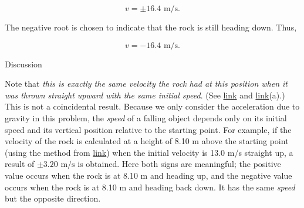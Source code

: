 \documentclass[
]{book}
\newenvironment{tinysection}{}{}
\begin{document}
\leavevmode\hypertarget{import-auto-id1763704}{}%
\[{{{v = {\pm \text{16}}}\text{.4\ m/s}}.}{}\]

The negative root is chosen to indicate that the rock is still heading
down. Thus,

\leavevmode\hypertarget{import-auto-id2563747}{}%
\[{{{v = {- \text{16}}}\text{.4\ m/s}}.}{}\]

\begin{tinysection}

{Discussion}

\end{tinysection}

Note that \emph{this is exactly the same velocity the rock had at this
position when it was thrown straight upward with the same initial
speed}. (See \protect\hyperlink{fs-id4067058}{link} and
\protect\hyperlink{import-auto-id4173440}{link}(a).) This is not
a coincidental result. Because we only consider the acceleration due to
gravity in this problem, the \emph{speed} of a falling object depends only on
its initial speed and its vertical position relative to the starting
point. For example, if the velocity of the rock is calculated at a
height of 8.10 m above the starting point (using the method from
\protect\hyperlink{fs-id4067058}{link}) when the initial velocity
is 13.0 m/s straight up, a result of \({{\pm 3}\text{.}\text{20\ m/s}}{}\)
is obtained. Here both signs are meaningful; the positive value occurs
when the rock is at 8.10 m and heading up, and the negative value occurs
when the rock is at 8.10 m and heading back down. It has the same
\emph{speed} but the opposite direction.
\end{document}

